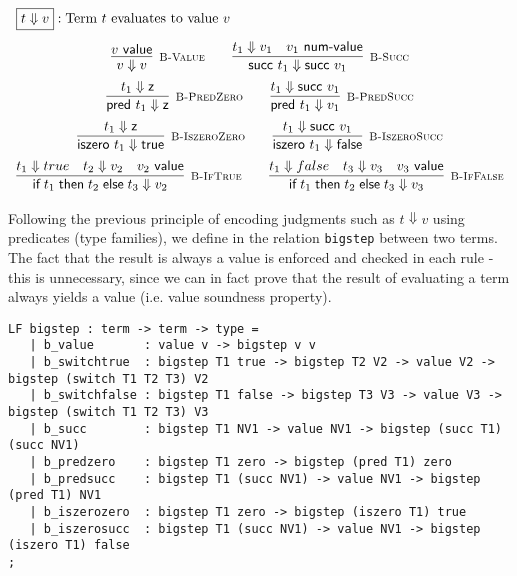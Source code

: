 \[
\begin{array}{c}
\multicolumn{1}{l}{\fbox{$t \Downarrow v$}: \mbox{Term $t$ evaluates to value $v$}}\\[1em]
  \infer[\BValue]{v \Downarrow v}{v \Value} \qquad
  \infer[\BSucc]{\tmsucc t_1 \Downarrow \tmsucc v_1}{t_1 \Downarrow v_1 & v_1 \NumValue} \\[0.5em]
  \infer[\BPredZero]{\tmpred t_1 \Downarrow \tmzero}{t_1 \Downarrow \tmzero} \qquad
  \infer[\BPredSucc]{\tmpred t_1 \Downarrow v_1}{t_1 \Downarrow \tmsucc v_1}
\\[0.5em]
  \infer[\BIszeroZero]{\tmiszero t_1 \Downarrow \tmtrue}{t_1 \Downarrow \tmzero} \qquad
  \infer[\BIszeroSucc]{\tmiszero t_1 \Downarrow \tmfalse}{t_1 \Downarrow \tmsucc v_1} 
\\[0.5em]
  \infer[\BIfTrue]{\tmif {t_1}{t_2}{t_3} \Downarrow v_2}{t_1 \Downarrow true & t_2 \Downarrow v_2 & v_2 \Value} \qquad
  \infer[\BIfFalse]{\tmif {t_1}{t_2}{t_3} \Downarrow v_3}{t_1 \Downarrow false & t_3 \Downarrow v_3 & v_3 \Value} \\

\end{array}
\]

Following the previous principle of encoding judgments such as $t \Downarrow v$
using predicates (type families), we define in \beluga the relation
\lstinline!bigstep! between two terms. The fact that the result is always a
value is enforced and checked in each rule - this is unnecessary, since we can
in fact prove that the result of evaluating a term always yields a value
(i.e. value soundness property).

\begin{lstlisting}
LF bigstep : term -> term -> type =
   | b_value       : value v -> bigstep v v
   | b_switchtrue  : bigstep T1 true -> bigstep T2 V2 -> value V2 -> bigstep (switch T1 T2 T3) V2
   | b_switchfalse : bigstep T1 false -> bigstep T3 V3 -> value V3 -> bigstep (switch T1 T2 T3) V3
   | b_succ        : bigstep T1 NV1 -> value NV1 -> bigstep (succ T1) (succ NV1)
   | b_predzero    : bigstep T1 zero -> bigstep (pred T1) zero
   | b_predsucc    : bigstep T1 (succ NV1) -> value NV1 -> bigstep (pred T1) NV1
   | b_iszerozero  : bigstep T1 zero -> bigstep (iszero T1) true
   | b_iszerosucc  : bigstep T1 (succ NV1) -> value NV1 -> bigstep (iszero T1) false
;
\end{lstlisting}


